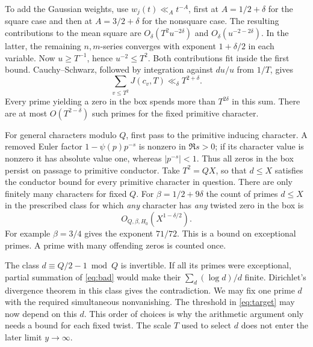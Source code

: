 To add the Gaussian weights, use \(w_j(t)\ll_A t^{-A}\), first at \(A=1/2+\delta\) for the square case and then at \(A=3/2+\delta\) for the nonsquare case. The resulting contributions to the mean square are \(O_\delta(T^2u^{-2\delta})\) and \(O_\delta(u^{-2-2\delta})\). In the latter, the remaining \(n,m\)-series converges with exponent \(1+\delta/2\) in each variable. Now \(u\ge T^{-1}\), hence \(u^{-2}\le T^2\). Both contributions fit inside the first bound. Cauchy--Schwarz, followed by integration against \(du/u\) from \(1/T\), gives
\[
                  \sum_{v\le T^2}J(c_v,T)\ll_\delta T^{2+\delta}.
\]
Every prime yielding a zero in the box spends more than \(T^{2\delta}\) in this sum. There are at most \(O(T^{2-\delta})\) such primes for the fixed primitive character.

For general characters modulo \(Q\), first pass to the primitive inducing character. A removed Euler factor \(1-\psi(p)p^{-s}\) is nonzero in \(\Re s>0\); if its character value is nonzero it has absolute value one, whereas \(|p^{-s}|<1\). Thus all zeros in the box persist on passage to primitive conductor. Take \(T^2=QX\), so that \(d\le X\) satisfies the conductor bound for every primitive character in question. There are only finitely many characters for fixed \(Q\). For \(\beta=1/2+9\delta\) the count of primes \(d\le X\) in the prescribed class for which \emph{any} character has \emph{any} twisted zero in the box is
\begin{equation}\label{eq:bad}
                  O_{Q,\beta,H_0}\!\left(X^{1-\delta/2}\right).
\end{equation}
For example \(\beta=3/4\) gives the exponent \(71/72\). This is a bound on exceptional primes. A prime with many offending zeros is counted once.

The class \(d\equiv Q/2-1\bmod Q\) is invertible. If all its primes were exceptional, partial summation of \eqref{eq:bad} would make their \(\sum_d(\log d)/d\) finite. Dirichlet's divergence theorem in this class gives the contradiction. We may fix one prime \(d\) with the required simultaneous nonvanishing. The threshold in \eqref{eq:target} may now depend on this \(d\). This order of choices is why the arithmetic argument only needs a bound for each fixed twist. The scale \(T\) used to select \(d\) does not enter the later limit \(y\to\infty\).

